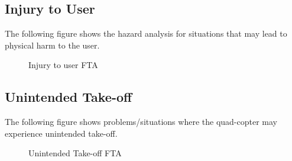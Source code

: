 \documentclass[10pt,letterpaper]{article}
\begin{document}
\newpage

\subsection{Injury to User}
The following figure shows the hazard analysis for situations that may lead to physical harm to the user.
\begin{figure}[h]
  \caption{Injury to user FTA}
  \label{fig:context_diagram}
\end{figure}
\newpage
\subsection{Unintended Take-off}
The following figure shows problems/situations where the quad-copter may experience unintended take-off.

\begin{figure}[h]
  \caption{Unintended Take-off FTA}
  \label{fig:context_diagram}
\end{figure}
\end{document}
